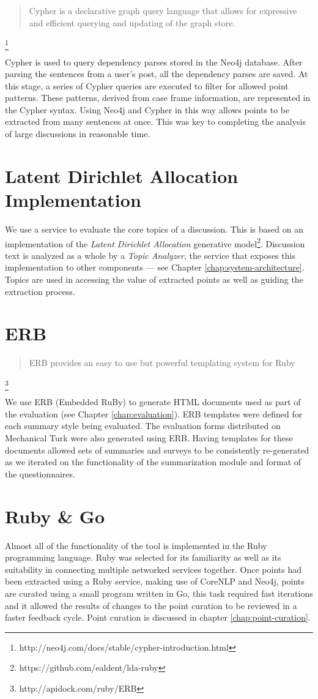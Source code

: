     \blockquote{Cypher is a declarative graph query language that allows for expressive and efficient querying and updating of the graph store.}\footnote{http://neo4j.com/docs/stable/cypher-introduction.html}

    Cypher is used to query dependency parses stored in the Neo4j database. After parsing the sentences from a user's post, all the dependency parses are saved. At this stage, a series of Cypher queries are executed to filter for allowed point patterns. These patterns, derived from case frame information, are represented in the Cypher syntax. Using Neo4j and Cypher in this way allows points to be extracted from many sentences at once. This was key to completing the analysis of large discussions in reasonable time.

  \tocless\section{Latent Dirichlet Allocation Implementation\label{sec:lda-tech}}
    We use a service to evaluate the core topics of a discussion. This is based on an implementation of the \textit{Latent Dirichlet Allocation} generative model\footnote{https://github.com/ealdent/lda-ruby}. Discussion text is analyzed as a whole by a \textit{Topic Analyzer}, the service that exposes this implementation to other components --- see Chapter \ref{chap:system-architecture}. Topics are used in accessing the value of extracted points as well as guiding the extraction process.

  \tocless\section{ERB}
    \blockquote{ERB provides an easy to use but powerful templating system for Ruby}\footnote{http://apidock.com/ruby/ERB}

    We use ERB (Embedded RuBy) to generate HTML documents used as part of the evaluation (see Chapter \ref{chap:evaluation}). ERB templates were defined for each summary style being evaluated. The evaluation forms distributed on Mechanical Turk were also generated using ERB. Having templates for these documents allowed sets of summaries and surveys to be consistently re-generated as we iterated on the functionality of the summarization module and format of the questionnaires.

  \tocless\section{Ruby \& Go}
    Almost all of the functionality of the tool is implemented in the Ruby programming language. Ruby was selected for its familiarity as well as its suitability in connecting multiple networked services together. Once points had been extracted using a Ruby service, making use of CoreNLP and Neo4j, points are curated using a small program written in Go, this task required fast iterations and it allowed the results of changes to the point curation to be reviewed in a faster feedback cycle. Point curation is discussed in chapter \ref{chap:point-curation}.


